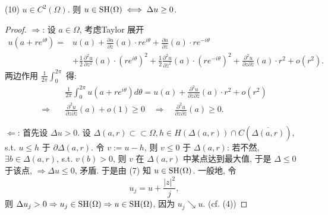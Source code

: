 \noindent (10) $u \in C^2(\Omega )$. 则 $u \in \operatorname{SH}(\Omega ) \iff \Delta u \geq 0$.  
\begin{proof}
  $\Rightarrow $: 设 $a \in \Omega $, 考虑Taylor 展开 
  $$ \begin{aligned}
    u(a+r e^{i \theta })=&u(a) + \frac{\partial u}{\partial z}(a) \cdot  r e^{i \theta }+ \frac{\partial u}{ \partial \bar z}(a) \cdot  r e^{-i \theta }\\
   &+ \frac{1}{2} \frac{\partial^2 u}{\partial z^2}(a) \cdot ( r e^{i \theta })^2+ \frac{1}{2} \frac{\partial^2 u}{\partial \bar z^2}(a) \cdot ( r e^{-i \theta })^2+ \frac{\partial^2 u}{\partial z \partial \bar z}(a) \cdot  r ^2+o(r^2).
  \end{aligned}  $$
 两边作用 $\frac{1}{2 \pi }\int_{0}^{2 \pi }$ 得: 
$$ \begin{aligned}
  &\frac{1}{2 \pi }\int_{0}^{2 \pi } u(a+r e^{i \theta }) d \theta = u(a)+\frac{\partial^2 u}{\partial z \partial \bar z}(a) \cdot  r ^2+o(r^2)\\
  \Rightarrow \quad & \frac{\partial^2 u}{\partial z \partial \bar z}(a) +o(1) \geq 0 \quad \Rightarrow \quad  \frac{\partial^2 u}{\partial z \partial \bar z}(a) \geq 0 .
\end{aligned}  $$

$\Leftarrow $:  
首先设 $\Delta u >0$. 
设 $\Delta (a,r) \subset \subset \Omega ,h \in H(\Delta (a,r)) \cap  C(\overline{\Delta (a,r)})$, s.t. $u \leq h$ 于 $\partial \Delta (a,r)$. 
令 $v:=u-h$, 则 $v \leq 0$ 于 $\Delta (a,r)$: 若不然, $\exists b \in \Delta (a,r)$, s.t. $v(b)>0$, 则 
$v$ 在 $\Delta (a,r)$ 中某点达到最大值, 于是 $\Delta  \leq 0$ 于该点, $\Rightarrow \Delta u \leq 0$, 矛盾. 于是由 (7) 知 $u \in \operatorname{SH}(\Omega )$. 
一般地, 令 
$$u_j=u+\frac{|z|^2}{j},$$
则 $\Delta u_j >0 \Rightarrow u_j \in \operatorname{SH} (\Omega ) \Rightarrow u \in \operatorname{SH} (\Omega )$, 因为 $u_j \searrow u$. (cf. (4))   
\end{proof}
 
